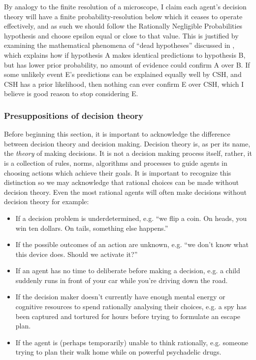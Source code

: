 \documentclass{article}
\begin{document}
By analogy to the finite resolution of a microscope, I claim each agent's decision theory will have a finite probability-resolution below which it ceases to operate effectively, and as such we should follow the Rationally Negligible Probabilities hypothesis and choose epsilon equal or close to that value. This is justified by examining the mathematical phenomena of ``dead hypotheses'' discussed in \citep{jaynes2003probability}, which explains how if hypothesis A makes identical predictions to hypothesis B, but has lower prior probability, no amount of evidence could confirm A over B. If some unlikely event E's predictions can be explained equally well by CSH, and CSH has a prior likelihood, then nothing can ever confirm E over CSH, which I believe is good reason to stop considering E.

\subsubsection{Presuppositions of decision theory}

Before beginning this section, it is important to acknowledge the difference between decision theory and decision making. Decision theory is, as per its name, the \textit{theory} of making decisions. It is not a decision making process itself, rather, it is a collection of rules, norms, algorithms and processes to guide agents in choosing actions which achieve their goals. It is important to recognize this distinction so we may acknowledge that rational choices can be made without decision theory. Even the most rational agents will often make decisions without decision theory \textemdash{} for example:

\begin{itemize}  
\item If a decision problem is underdetermined, e.g. ``we flip a coin. On heads, you win ten dollars. On tails, something else happens.''
\item If the possible outcomes of an action are unknown, e.g. ``we don't know what this device does. Should we activate it?''
\item If an agent has no time to deliberate before making a decision, e.g. a child suddenly runs in front of your car while you're driving down the road.
\item If the decision maker doesn't currently have enough mental energy or cognitive resources to spend rationally analysing their choices, e.g. a spy has been captured and tortured for hours before trying to formulate an escape plan.
\item If the agent is (perhaps temporarily) unable to think rationally, e.g. someone trying to plan their walk home while on powerful psychadelic drugs.
\end{itemize}
\end{document}
